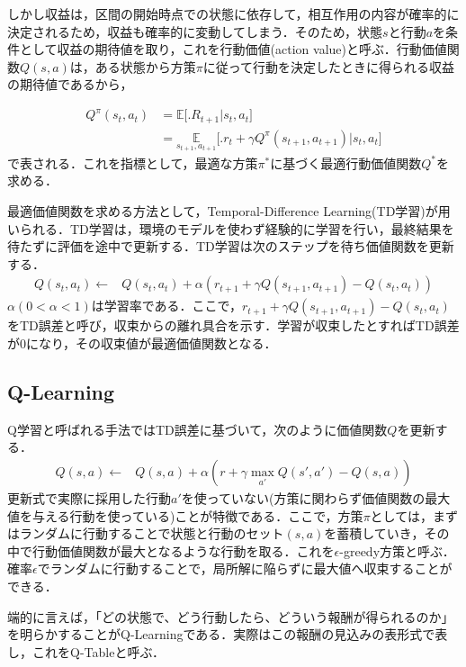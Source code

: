 しかし収益は，区間の開始時点での状態に依存して，相互作用の内容が確率的に決定されるため，収益も確率的に変動してしまう．そのため，状態$s$と行動$a$を条件として収益の期待値を取り，これを行動価値(action value)と呼ぶ．行動価値関数$Q(s,a)$は，ある状態から方策$\pi$に従って行動を決定したときに得られる収益の期待値であるから，

\begin{align}\label{eq:Qfunction}
  Q^{\pi}(s_t, a_t) & = \mathbb{E}\bigl[ \bigl. R_{t+1} \bigr| s_t, a_t\bigr] \\
    & = \underset{s_{t+1}, a_{t+1} }{\mathbb{E}}\bigl[ \bigl. r_t + \gamma Q^{\pi}(s_{t+1}, a_{t+1}) \bigr| s_t, a_t \bigr]
\end{align}
で表される．これを指標として，最適な方策$\pi ^*$に基づく最適行動価値関数$Q^*$を求める．

最適価値関数を求める方法として，Temporal-Difference Learning(TD学習)が用いられる．TD学習は，環境のモデルを使わず経験的に学習を行い，最終結果を待たずに評価を途中で更新する．TD学習は次のステップを待ち価値関数を更新する．
\begin{align}\label{eq:TD}
Q(s_t, a_t) \leftarrow & Q(s_t, a_t) + \alpha (r_{t+1} + \gamma Q(s_{t+1}, a_{t+1}) - Q(s_t, a_t) )
\end{align}
$\alpha(0<\alpha<1)$は学習率である．ここで，$r_{t+1} + \gamma Q(s_{t+1}, a_{t+1}) - Q(s_t, a_t)$をTD誤差と呼び，収束からの離れ具合を示す．学習が収束したとすればTD誤差が0になり，その収束値が最適価値関数となる．

\subsection{Q-Learning}
Q学習\cite{QLearning}と呼ばれる手法ではTD誤差に基づいて，次のように価値関数$Q$を更新する．
\begin{align}\label{eq:Qupdate}
    Q(s,a) \leftarrow & Q(s,a) + \alpha (r + \gamma\underset{a'}{\max}{Q(s',a')} - Q(s,a))
\end{align}
更新式で実際に採用した行動$a'$を使っていない(方策に関わらず価値関数の最大値を与える行動を使っている)ことが特徴である．ここで，方策$\pi$としては，まずはランダムに行動することで状態と行動のセット$(s,a)$を蓄積していき，その中で行動価値関数が最大となるような行動を取る．これを$\epsilon$-greedy方策と呼ぶ．確率$\epsilon$でランダムに行動することで，局所解に陥らずに最大値へ収束することができる．

端的に言えば，「どの状態で、どう行動したら、どういう報酬が得られるのか」を明らかすることがQ-Learningである．実際はこの報酬の見込みの表形式で表し，これをQ-Tableと呼ぶ．

